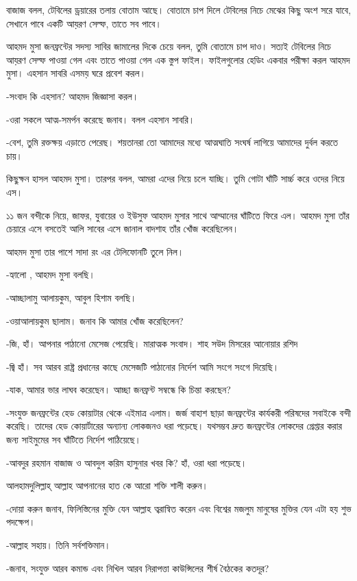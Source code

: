 \documentclass[
]{book}
\begin{document}
বাজাজ বলল, টেবিলের ড্রয়ারের তলায় বোতাম আছে। বোতামে চাপ দিলে টেবিলের নিচে মেঝের কিছু অংশ সরে যাবে, সেখানে পাবে একটি আয়রণ সেল্ফ, তাতে সব পাবে।

আহমদ মুসা জনফ্রন্টের সদস্য সাবির জামালের দিকে চেয়ে বলল, তুমি বোতামে চাপ দাও। সত্যই টেবিলের নিচে আয়রণ সেল্ফ পাওয়া গেল এবং তাতে পাওয়া গেল এক স্তুপ ফাইল। ফাইলগুলোর হেডিং একবার পরীক্ষা করল আহমদ মুসা। এহসান সাবরি এসময় ঘরে প্রবেশ করল।

-সংবাদ কি এহসান? আহমদ জিজ্ঞাসা করল।

-ওরা সকলে আত্ম-সমর্পন করেছে জনাব। বলল এহসান সাবরি।

-বেশ, তুমি রক্তক্ষয় এড়াতে পেরেছ। শয়তানরা তো আমাদের মধ্যে আত্মঘাতি সংঘর্ষ লাগিয়ে আমাদের দুর্বল করতে চায়।

কিছুক্ষন হাসল আহমদ মুসা। তারপর বলল, আমরা এদের নিয়ে চলে যাচ্ছি। তুমি গোটা ঘাঁটি সার্চ্চ করে ওদের নিয়ে এস।

১১ জন বন্দীকে নিয়ে, জাফর, যুবায়ের ও ইউসুফ আহমদ মুসার সাথে আম্মানের ঘাঁটিতে ফিরে এল। আহমদ মুসা তাঁর চেয়ারে এসে বসতেই আলি সাবের এসে জানাল বাদশাহ তাঁর খোঁজ করেছিলেন।

আহমদ মুসা তার পাশে সাদা রং এর টেলিফোনটি তুলে নিল।

-হ্যালো , আহমদ মুসা বলছি।

-আচ্ছালামু আলায়কুম, আবুল হিশাম বলছি।

-ওয়াআলায়কুম ছালাম। জনাব কি আমার খোঁজ করেছিলেন?

-জি, হাঁ। আপনার পাঠানো মেসেজ পেয়েছি। মারাত্মক সংবাদ। শাহ সউদ মিসরের আনোয়ার রশিদ

-জ্বি হাঁ। সব আরব রাষ্ট্র প্রধানের কাছে মেসেজটি পাঠানোর নির্দেশ আমি সংগে সংগে দিয়েছি।

-যাক, আমার ভার লাঘব করেছেন। আচ্ছা জনফ্রন্ট সম্বন্ধে কি চিন্তা করছেন?

-সংযুক্ত জনফ্রন্টের হেড কোয়াটার থেকে এইমাত্র এলাম। জর্জ বাহাশ ছাড়া জনফ্রন্টের কার্যকরী পরিষদের সবাইকে বন্দী করেছি। তাদের হেড কোয়ার্টারের অন্যান্য লোকজনও ধরা পড়েছে। যথসম্ভব দ্রুত জনফ্রন্টের লোকদের গ্রেপ্তার করার জন্য সাইমুমের সব ঘাঁটিতে নির্দেশ পাঠিয়েছে।

-আবদুর রহমান বাজাজ ও আবদুল করিম হাসুনার খবর কি? হাঁ, ওরা ধরা পড়েছে।

আলহামদুলিল্লাহ্ আল্লাহ আপনানের হাত কে আরো শক্তি শালী করুন।

-দোয়া করুন জনাব, ফিলিস্তিনের মুক্তি যেন আল্লাহ ত্বরান্বিত করেন এবং বিশ্বের মজলুম মানুষের মুক্তির যেন এটা হয় শুভ পদক্ষেপ।

-আল্লাহ সহায়। তিনি সর্বশক্তিমান।

-জনাব, সংযুক্ত আরব কমান্ড এবং নিখিল আরব নিরাপত্তা কাউন্সিলের শীর্ষ বৈঠকের কতদূর?
\end{document}
